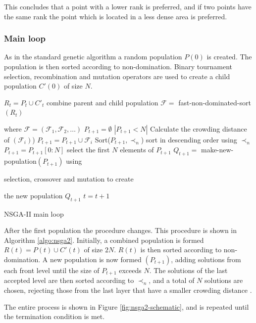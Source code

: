\documentclass[10pt, conference, compsocconf]{IEEEtran}
\begin{document}
This concludes that a point with a lower rank is preferred, and if two points have the same rank the point which is located in a less dense area is preferred.

\subsubsection{Main loop}
As in the standard genetic algorithm a random population $P(0)$ is created. The population is then  sorted according to non-domination. Binary tournament selection, recombination and mutation operators are used to create a child population $C'(0)$ of size $N$. 

\begin{algorithm}[b]
\begin{algorithmic}[1]
\State $R_t=P_t \cup C'_t$ combine parent and child population
\State $\mathcal{F} = $ fast-non-dominated-sort $(R_t)$ 

where $\mathcal{F}=(\mathcal{F}_1, \mathcal{F}_2,\ldots)$
\State $P_{t+1}=\emptyset$
\While $\left|P_{t+1}<N\right|$
\State Calculate the crowding distance of $(\mathcal{F}_i)$)
\State $P_{t+1}=P_{t+1}\cup \mathcal{F}_i$
\EndWhile
\State Sort($P_{t+1}, \prec_n$) sort in descending order using $\prec_n$
\State $P_{t+1} = P_{t+1}[0:N]$ select the first $N$ elements of $P_{t+1}$
\State $Q_{t+1} = $ make-new-population$(P_{t+1})$ using 

selection, crossover and mutation to create 

the new population $Q_{t+1}$
\State $t=t+1$
\caption{NSGA-II main loop \cite{Valkanas2014}}
\label{algo:nsga2}
\end{algorithmic}
\end{algorithm}


After the first population the procedure changes. This procedure is shown in Algorithm \ref{algo:nsga2}. Initially, a combined population is formed $R(t)=P(t) \cup C'(t)$ of size $2N$. $R(t)$ is then sorted according to non-domination. A new population is now formed $(P_{t+1})$, adding solutions from each front level until the size of $P_{t+1}$ exceeds $N$. The solutions of the last accepted level are then sorted according to $\prec_n$, and a total of $N$ solutions are chosen, rejecting those from the last layer that have a smaller crowding distance \cite{Valkanas2014}.

The entire process is shown in Figure \ref{fig:nsga2-schematic}, and is repeated until the termination condition is met.
\end{document}
